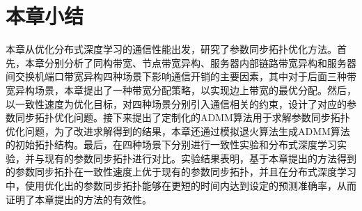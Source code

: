 \begin{table}[!htpb]
    \center
    \caption{服务器间交换机端口带宽异构场景下测试准确率达到设定值所需的时间（单位：s）}
    \label{tab:bandwidth-constraint-inter-accuracy-time}
\end{table}


\section{本章小结}
本章从优化分布式深度学习的通信性能出发，研究了参数同步拓扑优化方法。首先，本章分别分析了同构带宽、节点带宽异构、服务器内部链路带宽异构和服务器间交换机端口带宽异构四种场景下影响通信开销的主要因素，其中对于后面三种带宽异构场景，本章提出了一种带宽分配策略，以实现边上带宽的最优分配。然后，以一致性速度为优化目标，对四种场景分别引入通信相关的约束，设计了对应的参数同步拓扑优化问题。接下来提出了定制化的ADMM算法用于求解参数同步拓扑优化问题，为了改进求解得到的结果，本章还通过模拟退火算法生成ADMM算法的初始拓扑结构。最后，在四种场景下分别进行一致性实验和分布式深度学习实验，并与现有的参数同步拓扑进行对比。实验结果表明，基于本章提出的方法得到的参数同步拓扑在一致性速度上优于现有的参数同步拓扑，并且在分布式深度学习中，使用优化出的参数同步拓扑能够在更短的时间内达到设定的预测准确率，从而证明了本章提出的方法的有效性。



